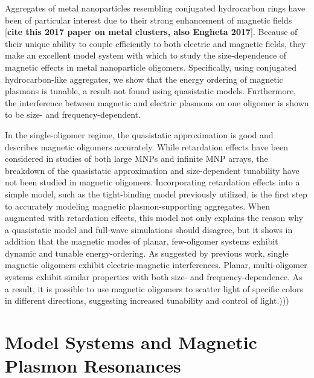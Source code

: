 \documentclass[journal=apchd5,manuscript=article]{achemso}
\begin{document}
Aggregates of metal nanoparticles resembling conjugated hydrocarbon rings have been of particular interest due to their strong enhancement of magnetic fields [\textbf{cite this 2017 paper on metal clusters, also Engheta 2017}]. Because of their unique ability to couple efficiently to both electric and magnetic fields, they make an excellent model system with which to study the size-dependence of magnetic effects in metal nanoparticle oligomers. Specifically, using conjugated hydrocarbon-like aggregates, we show that the energy ordering of magnetic plasmons is tunable, a result not found using quasistatic models. Furthermore, the interference between magnetic and electric plasmons on one oligomer is shown to be size- and frequency-dependent. 

In the single-oligomer regime, the quasistatic approximation is good and describes magnetic oligomers accurately\cite{Nord2006,Dionne2016}. While retardation effects have been considered in studies of both large MNPs and infinite MNP arrays\cite{Abajo2008,Gu2010,vonPlessen2007,Rechbacher2003,Kottman2001,Schatz2003,Royer2005,Chumanov2010,Pinchuk2016}, the breakdown of the quasistatic approximation and size-dependent tunability have not been studied in magnetic oligomers. Incorporating retardation effects into a simple model, such as the tight-binding model previously utilized\cite{Cherqui2014}, is the first step to accurately modeling magnetic plasmon-supporting aggregates. When augmented with retardation effects, this model not only explains the reason why a quasistatic model and full-wave simulations should disagree, but it shows in addition that the magnetic modes of planar, few-oligomer systems exhibit dynamic and tunable energy-ordering. As suggested by previous work, single magnetic oligomers exhibit electric-magnetic interferences.\cite{Dionne2011}  Planar, multi-oligomer systems exhibit similar properties with both size- and frequency-dependence. As a result, it is possible to use magnetic oligomers to scatter light of specific colors in different directions, suggesting increased tunability and control of light.)))

\section{Model Systems and Magnetic Plasmon Resonances}
\end{document}
